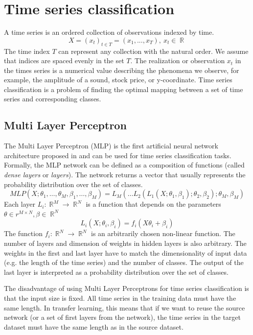 \documentclass[a4paper,11pt,twoside]{report}
\theoremstyle{definition}
\DeclareMathOperator{\real}{\mathbb{R}}
\begin{document}
\section{Time series classification}
A time series is an ordered collection of observations indexed by time.
$$X = (x_t)_{t\in T} = (x_1, ... , x_T),\ x_t\in \real$$
The time index $T$ can represent any collection with the natural order. We assume that indices are spaced evenly in the set $T$. The realization or observation $x_t$ in the times series is a numerical value describing the phenomena we observe, for example, the amplitude of a sound, stock price, or y-coordinate. Time series classification is a problem of finding the optimal mapping between a set of time series and corresponding classes.



\subsection{Multi Layer Perceptron}
The Multi Layer Perceptron (MLP) is the first artificial neural network architecture proposed in \cite{dl_tsc} and can be used for time series classification tasks.
Formally, the MLP network can be defined as a composition of functions (called \textit{dense layers} or \textit{layers}). The network returns a vector that usually represents the probability distribution over the set of classes.
$$MLP(X; \theta_1,\dots , \theta_M, \beta_1,\dots , \beta_M) = L_M(\dots L_2(L_1(X;\theta_1, \beta_1);\theta_2, \beta_2);\theta_M, \beta_M)$$
Each layer $L_i: \real^M \rightarrow \real^N$ is a function that depends on the parameters $\theta \in r^{M\times N}, \beta \in \real^N$
$$L_i(X ; \theta_i, \beta_i) = f_i(X \theta_i  + \beta_i)$$
The function $f_i: \real^N \rightarrow \real^N$ is an arbitrarily chosen non-linear function. The number of layers and dimension of weights in hidden layers is also arbitrary. The weights in the first and last layer have to match the dimensionality of input data (e.g. the length of the time series) and the number of classes. The output of the last layer is interpreted as a probability distribution over the set of classes.

The disadvantage of using Multi Layer Perceptrons for time series classification is that the input size is fixed. All time series in the training data must have the same length. In transfer learning, this means that if we want to reuse the source network (or a set of first layers from the network), the time series in the target dataset must have the same length as in the source dataset.
\end{document}
